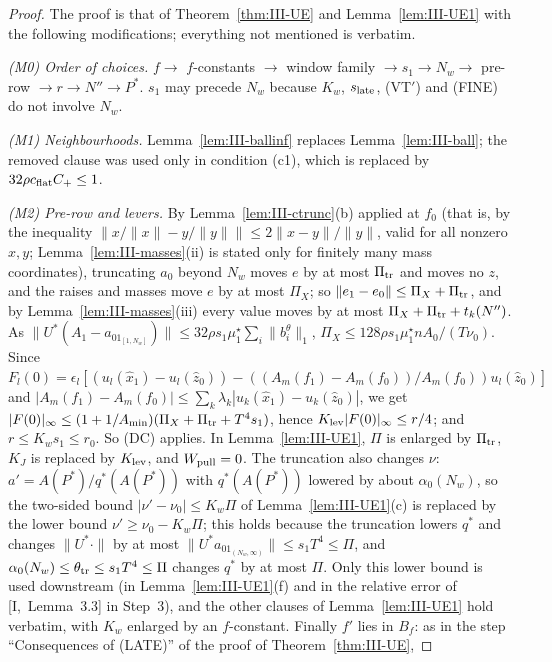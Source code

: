 \documentclass[10pt]{amsart}
\theoremstyle{definition}
\theoremstyle{remark}
\newcommand{\zh}{\hat z}
\begin{document}
\begin{proof}
The proof is that of Theorem~\ref{thm:III-UE} and Lemma~\ref{lem:III-UE1}
with the following modifications; everything not mentioned is verbatim.

\emph{(M0) Order of choices.}  $f\to$ $f$-constants $\to$ window family $\to
s_1\to N_w\to$ pre-row $\to r\to N''\to P^*$.  $s_1$ may precede $N_w$ because
$K_w$, $s_{\rm late}$, (VT$'$) and (FINE) do not involve $N_w$.

\emph{(M1) Neighbourhoods.}  Lemma~\ref{lem:III-ballinf} replaces
Lemma~\ref{lem:III-ball}; the removed clause was used only in condition
(c1), which is replaced by $32\rho c_{\rm flat}C_+\le1$.

\emph{(M2) Pre-row and levers.}  By Lemma~\ref{lem:III-ctrunc}(b) applied at
$f_0$ (that is, by the inequality $\|x/\|x\|-y/\|y\|\|\le2\|x-y\|/\|y\|$, valid
for all nonzero $x,y$; Lemma~\ref{lem:III-masses}(ii) is stated only for
finitely many mass coordinates), truncating $a_0$ beyond $N_w$ moves $e$ by at
most $\Pi_{\rm tr}$ and moves no $z$, and the raises and masses move $e$ by at
most $\Pi_X$; so
$\|e_1-e_0\|\le\Pi_X+\Pi_{\rm tr}$, and by Lemma~\ref{lem:III-masses}(iii)
every value moves by at most $\Pi_X+\Pi_{\rm tr}+t_k(N'')$.  As
$\|U^*(A_1-a_01_{[1,N_w]})\|\le32\rho s_1\mu^\star_1\sum_i\|b^\theta_i\|_1$,
$\Pi_X\le128\rho s_1\mu^\star_1nA_0/(T\nu_0)$.  Since $F_l(0)=\epsilon_l[(u_l
(\hat x_1)-u_l(\zh_0))-((A_m(f_1)-A_m(f_0))/A_m(f_0))u_l(\zh_0)]$ and
$|A_m(f_1)-A_m(f_0)|\le\sum_k\lambda_k|u_k(\hat x_1)-u_k(\zh_0)|$, we get
$|F(0)|_\infty\le(1+1/A_{\min})(\Pi_X+\Pi_{\rm tr}+T^4s_1)$, hence
$K_{\rm lev}|F(0)|_\infty\le r/4$; and $r\le K_ws_1\le r_0$.  So (DC)
applies.  In Lemma~\ref{lem:III-UE1}, $\Pi$ is enlarged by $\Pi_{\rm tr}$,
$K_J$ is replaced by $K_{\rm lev}$, and $W_{\rm pull}=0$.  The truncation also
changes $\nu$: $a'=A(P^*)/q^*(A(P^*))$ with $q^*(A(P^*))$ lowered by about
$\alpha_0(N_w)$, so the two-sided bound $|\nu'-\nu_0|\le K_w\Pi$ of
Lemma~\ref{lem:III-UE1}(c) is replaced by the lower bound $\nu'\ge\nu_0-
K_w\Pi$; this holds because the truncation lowers $q^*$ and changes
$\|U^*\cdot\|$ by at most $\|U^*a_01_{(N_w,\infty)}\|\le s_1T^4\le\Pi$, and
$\alpha_0(N_w)\le\theta_{\rm tr}\le s_1T^4\le\Pi$ changes $q^*$ by at most
$\Pi$.  Only this lower bound is used downstream (in
Lemma~\ref{lem:III-UE1}(f) and in the relative error of [I,~Lemma~3.3] in
Step~3), and the other clauses of Lemma~\ref{lem:III-UE1} hold verbatim,
with $K_w$ enlarged by an $f$-constant.  Finally $f'$ lies in $B_f$: as in the
step ``Consequences of (LATE)'' of the proof of Theorem~\ref{thm:III-UE},

\end{proof}
\end{document}
